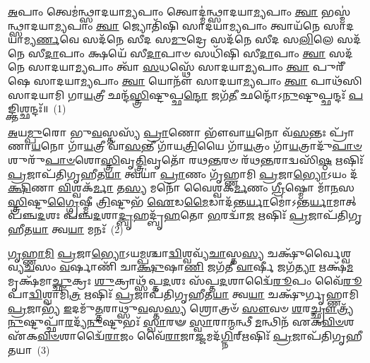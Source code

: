 \setcounter{anuvakam}{0}
\-\ul{𑌅}\-𑌪𑌾𑌂 𑌤𑍍𑌵𑍇𑌮॑𑌨𑍍𑌥𑍍𑌸𑌾𑌦𑌯𑌾\-\ul{𑌮𑍍𑌯}\-𑌪𑌾𑌂 𑌤𑍍𑌵𑍋𑌦𑍍𑌮॑𑌨𑍍𑌥𑍍𑌸𑌾𑌦𑌯𑌾\-\ul{𑌮𑍍𑌯}\-𑌪𑌾𑌂 \ul{𑌤𑍍𑌵𑌾} 𑌭𑌸𑍍𑌮॑𑌨𑍍𑌥𑍍𑌸𑌾𑌦𑌯𑌾\-\ul{𑌮𑍍𑌯}\-𑌪𑌾𑌂 \ul{𑌤𑍍𑌵𑌾} 𑌜𑍍𑌯𑍋𑌤𑌿᳴𑌷𑌿 𑌸𑌾𑌦𑌯𑌾\-\ul{𑌮𑍍𑌯}\-𑌪𑌾𑌂 𑌤𑍍𑌵𑌾𑌯᳴𑌨𑍇 𑌸𑌾𑌦𑌯𑌾𑌮𑍍𑌯\-\ul{𑌰𑍍𑌣}\-𑌵𑍇 𑌸𑌦᳴𑌨𑍇 𑌸𑍀𑌦 𑌸\-\ul{𑌮𑍁}\-𑌦𑍍𑌰𑍇 𑌸𑌦᳴𑌨𑍇 𑌸𑍀𑌦 𑌸\-\ul{𑌲𑌿}\-𑌲𑍇 𑌸𑌦᳴𑌨𑍇 𑌸𑍀\-\ul{𑌦𑌾}\-𑌪𑌾𑌂 𑌕𑍍𑌷𑌯𑍇᳴ 𑌸𑍀\-\ul{𑌦𑌾}\-𑌪𑌾𑍞 𑌸𑌧𑌿᳴𑌷𑌿 𑌸𑍀\-\ul{𑌦𑌾}\-𑌪𑌾𑌂 \ul{𑌤𑍍𑌵𑌾} 𑌸𑌦᳴𑌨𑍇 𑌸𑌾𑌦𑌯𑌾\-\ul{𑌮𑍍𑌯}\-𑌪𑌾𑌂 𑌤𑍍𑌵𑌾᳴ \ul{𑌸}\-𑌧𑌸𑍍𑌥𑍇᳴ 𑌸𑌾𑌦𑌯𑌾\-\ul{𑌮𑍍𑌯}\-𑌪𑌾𑌂 \ul{𑌤𑍍𑌵𑌾} 𑌪𑍁𑌰𑍀᳴𑌷𑍇 𑌸𑌾𑌦𑌯𑌾\-\ul{𑌮𑍍𑌯}\-𑌪𑌾𑌂 \ul{𑌤𑍍𑌵𑌾} 𑌯𑍋𑌨𑍗᳴ 𑌸𑌾𑌦𑌯𑌾\-\ul{𑌮𑍍𑌯}\-𑌪𑌾𑌂 \ul{𑌤𑍍𑌵𑌾} 𑌪𑌾𑌥᳴𑌸𑌿 𑌸𑌾𑌦𑌯𑌾𑌮𑌿 𑌗𑌾\-\ul{𑌯}\-𑌤𑍍𑌰𑍀 𑌛𑌨𑍍𑌦᳴\-\ul{𑌸𑍍𑌤𑍍𑌰𑌿}\-𑌷𑍍𑌟𑍁𑌪𑍍𑌛\-\ul{𑌨𑍍𑌦𑍋} 𑌜𑌗᳴\-\ul{𑌤𑍀} 𑌛𑌨𑍍𑌦𑍋᳴\-𑌽\-\ul{𑌨𑍁}\-𑌷𑍍𑌟𑍁𑌪𑍍𑌛𑌨𑍍𑌦𑌃᳴ \ul{𑌪}\-𑌙𑍍𑌕𑍍𑌤𑌿𑌶𑍍𑌛𑌨𑍍𑌦𑌃᳴॥~(1)

{\anuvakamend[{𑌯𑍋\-\ul{𑌨𑍗} 𑌪𑌞𑍍𑌚᳴𑌦𑌶 𑌚}]}%

\-\ul{𑌅}\-𑌯\-\ul{𑌮𑍍𑌪𑍁}\-𑌰𑍋 𑌭𑍁\-\ul{𑌵}\-𑌸𑍍𑌤𑌸𑍍𑌯᳴ \ul{𑌪𑍍𑌰𑌾}\-𑌣𑍋 𑌭𑍗᳴𑌵𑌾\-\ul{𑌯}\-𑌨𑍋 𑌵᳴\-\ul{𑌸}\-𑌨𑍍𑌤𑌃 𑌪𑍍𑌰𑌾᳴𑌣𑌾\-\ul{𑌯}\-𑌨𑍋 𑌗𑌾᳴\-\ul{𑌯}\-𑌤𑍍𑌰𑍀 𑌵𑌾᳴\-\ul{𑌸}\-𑌨𑍍𑌤𑍀 𑌗𑌾᳴𑌯\-\ul{𑌤𑍍𑌰𑌿}\-𑌯𑍈 𑌗𑌾᳴\-\ul{𑌯}\-𑌤𑍍𑌰𑌂 𑌗𑌾᳴\-\ul{𑌯}\-𑌤𑍍𑌰𑌾𑌦𑍁᳴\-\ul{𑌪𑌾}\-\-\ul{𑍞}\-𑌶𑍁\-𑌰𑍁᳴\-\ul{𑌪𑌾}\-\-\ul{𑍞}\-𑌶𑍋\-\ul{𑌸𑍍𑌤𑍍𑌰𑌿}\-𑌵𑍃\-\ul{𑌤𑍍𑌤𑍍𑌰𑌿}\-𑌵𑍃𑌤𑍋᳴ 𑌰𑌥\-\ul{𑌨𑍍𑌤}\-𑌰𑍞 𑌰᳴𑌥\-\ul{𑌨𑍍𑌤}\-𑌰𑌾𑌦𑍍𑌵𑌸𑌿᳴\-\ul{𑌷𑍍𑌠} 𑌋𑌷𑌿𑌃᳴ \ul{𑌪𑍍𑌰}\-𑌜𑌾𑌪᳴𑌤𑌿𑌗𑍃𑌹𑍀𑌤\-\ul{𑌯𑌾} 𑌤𑍍𑌵𑌯𑌾॑ \ul{𑌪𑍍𑌰𑌾}\-𑌣𑌂 𑌗𑍃᳴𑌹𑍍𑌣𑌾𑌮𑌿 \ul{𑌪𑍍𑌰}\-𑌜𑌾\-\ul{𑌭𑍍𑌯𑍋}\-\-𑌽𑌯𑌂 𑌦᳴\-\ul{𑌕𑍍𑌷𑌿}\-𑌣𑌾 \ul{𑌵𑌿}\-𑌶𑍍𑌵𑌕᳴\-\ul{𑌰𑍍𑌮𑌾} 𑌤\-\ul{𑌸𑍍𑌯} 𑌮𑌨𑍋᳴ 𑌵𑍈𑌶𑍍𑌵𑌕\-\ul{𑌰𑍍𑌮}\-𑌣𑌂 \ul{𑌗𑍍𑌰𑍀}\-𑌷𑍍𑌮𑍋 𑌮𑌾᳴\-\ul{𑌨}\-𑌸\-\ul{𑌸𑍍𑌤𑍍𑌰𑌿}\-𑌷𑍍𑌟𑍁\-\ul{𑌗𑍍𑌗𑍍𑌰𑍈}\-𑌷𑍍𑌮𑍀 \ul{𑌤𑍍𑌰𑌿}\-𑌷𑍍𑌟𑍁𑌭᳴ \ul{𑌐}\-𑌡\-\ul{𑌮𑍈}\-𑌡𑌾𑌦᳴𑌨𑍍𑌤\-\ul{𑌰𑍍𑌯𑌾}\-𑌮𑍋॑\-𑌽𑌨𑍍𑌤\-\ul{𑌰𑍍𑌯𑌾}\-𑌮𑌾𑌤𑍍 𑌪᳴𑌞𑍍𑌚\-\ul{𑌦}\-𑌶𑌃 𑌪᳴𑌞𑍍𑌚\-\ul{𑌦}\-𑌶𑌾\-\ul{𑌦𑍍𑌬𑍃}\-𑌹𑌦𑍍𑌬𑍃᳴\-\ul{𑌹}\-𑌤𑍋 \ul{𑌭}\-𑌰𑌦𑍍𑌵𑌾᳴\-\ul{𑌜} 𑌋𑌷𑌿𑌃᳴ \ul{𑌪𑍍𑌰}\-𑌜𑌾𑌪᳴𑌤𑌿𑌗𑍃𑌹𑍀𑌤\-\ul{𑌯𑌾} 𑌤𑍍𑌵\-\ul{𑌯𑌾} 𑌮𑌨𑌃᳴~(2)

\-\ul{𑌗𑍃}\-\-\ul{𑌹𑍍𑌣𑌾}\-\-\ul{𑌮𑌿} \ul{𑌪𑍍𑌰}\-𑌜𑌾\-\ul{𑌭𑍍𑌯𑍋}\-\-𑌽𑌯\-\ul{𑌮𑍍𑌪}\-𑌶𑍍𑌚𑌾\-\ul{𑌦𑍍𑌵𑌿}\-𑌶𑍍𑌵𑌵𑍍𑌯᳴\-\ul{𑌚𑌾}\-𑌸𑍍𑌤\-\ul{𑌸𑍍𑌯} 𑌚𑌕𑍍𑌷𑍁᳴𑌰𑍍𑌵𑍈𑌶𑍍𑌵𑌵𑍍𑌯\-\ul{𑌚}\-𑌸𑌂 \ul{𑌵}\-𑌰𑍍\mbox{}𑌷𑌾𑌣𑌿᳴ 𑌚𑌾\-\ul{𑌕𑍍𑌷𑍁}\-𑌷𑌾\-\ul{𑌣𑌿} 𑌜𑌗᳴𑌤𑍀 \ul{𑌵𑌾}\-𑌰𑍍\mbox{}𑌷𑍀 𑌜𑌗᳴\-\ul{𑌤𑍍𑌯𑌾} 𑌋𑌕𑍍𑌷᳴\-\ul{𑌮}\-𑌮𑍃𑌕𑍍𑌷᳴𑌮𑌾\-\ul{𑌚𑍍𑌛𑍁}\-𑌕𑍍𑌰𑌃 \ul{𑌶𑍁}\-𑌕𑍍𑌰𑌾𑌥𑍍𑌸᳴𑌪𑍍𑌤\-\ul{𑌦}\-𑌶𑌃 𑌸᳴𑌪𑍍𑌤\-\ul{𑌦}\-𑌶𑌾𑌦𑍍𑌵𑍈᳴\-\ul{𑌰𑍂}\-𑌪𑌂 𑌵𑍈᳴\-\ul{𑌰𑍂}\-𑌪𑌾\-\ul{𑌦𑍍𑌵𑌿}\-𑌶𑍍𑌵𑌾𑌮𑌿᳴\-\ul{𑌤𑍍𑌰} 𑌋𑌷𑌿𑌃᳴ \ul{𑌪𑍍𑌰}\-𑌜𑌾𑌪᳴𑌤𑌿𑌗𑍃𑌹𑍀𑌤\-\ul{𑌯𑌾} 𑌤𑍍𑌵\-\ul{𑌯𑌾} 𑌚𑌕𑍍𑌷𑍁᳴𑌰𑍍𑌗𑍃𑌹𑍍𑌣𑌾𑌮𑌿 \ul{𑌪𑍍𑌰}\-𑌜𑌾𑌭𑍍𑌯᳴ \ul{𑌇}\-𑌦𑌮𑍁᳴\-\ul{𑌤𑍍𑌤}\-𑌰𑌾𑌥𑍍𑌸𑍁\-\ul{𑌵}\-𑌸𑍍𑌤\-\ul{𑌸𑍍𑌯} 𑌶𑍍𑌰𑍋𑌤𑍍𑌰𑍞᳴ \ul{𑌸𑍗}\-𑌵𑍞 \ul{𑌶}\-𑌰\-\ul{𑌚𑍍𑌛𑍍𑌰𑍗}\-𑌤𑍍𑌰𑍍𑌯᳴\-\ul{𑌨𑍁}\-𑌷𑍍𑌟𑍁𑌪𑍍𑌛𑌾᳴\-\ul{𑌰}\-𑌦𑍍𑌯᳴\-\ul{𑌨𑍁}\-𑌷𑍍𑌟𑍁𑌭𑌃᳴ \ul{𑌸𑍍𑌵𑌾}\-𑌰𑍟 \ul{𑌸𑍍𑌵𑌾}\-𑌰𑌾\-\ul{𑌨𑍍𑌮}\-𑌨𑍍𑌥𑍀 \ul{𑌮}\-𑌨𑍍𑌥𑌿𑌨᳴ 𑌏𑌕\-\ul{𑌵𑌿}\-\-\ul{𑍞}\-𑌶 𑌏᳴𑌕\-\ul{𑌵𑌿}\-\-\ul{𑍞}\-𑌶𑌾𑌦𑍍𑌵𑍈᳴\-\ul{𑌰𑌾}\-𑌜𑌂 𑌵𑍈᳴\-\ul{𑌰𑌾}\-𑌜𑌾\-\ul{𑌜𑍍𑌜}\-𑌮𑌦᳴\-\ul{𑌗𑍍𑌨𑌿}\-𑌰𑍍\mbox{}𑌋𑌷𑌿𑌃᳴ \ul{𑌪𑍍𑌰}\-𑌜𑌾𑌪᳴𑌤𑌿𑌗𑍃𑌹𑍀𑌤𑌯𑌾~(3)

